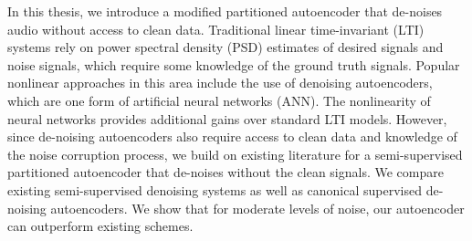 
In this thesis, we introduce a modified partitioned autoencoder that de-noises audio without access to clean data. Traditional linear time-invariant (LTI) systems rely on power spectral density (PSD) estimates of desired signals and noise signals, which require some knowledge of the ground truth signals. Popular nonlinear approaches in this area include the use of denoising autoencoders, which are one form of artificial neural networks (ANN). The nonlinearity of neural networks provides additional gains over standard LTI models. However, since de-noising autoencoders also require access to clean data and knowledge of the noise corruption process, we build on existing literature for a semi-supervised partitioned autoencoder that de-noises without the clean signals. We compare existing semi-supervised denoising systems as well as canonical supervised de-noising autoencoders. We show that for moderate levels of noise, our autoencoder can outperform existing schemes.
